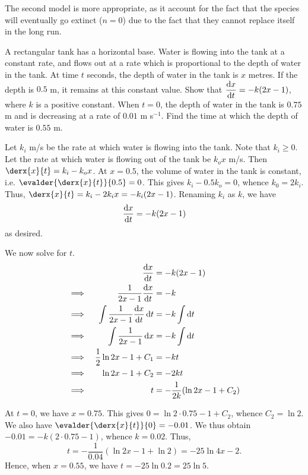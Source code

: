 \documentclass{echw}
\begin{document}
        The second model is more appropriate, as it account for the fact that the species will eventually go extinct ($n = 0$) due to the fact that they cannot replace itself in the long run.

    \problem{}
        A rectangular tank has a horizontal base. Water is flowing into the tank at a constant rate, and flows out at a rate which is proportional to the depth of water in the tank. At time $t$ seconds, the depth of water in the tank is $x$ metres. If the depth is $0.5$ m, it remains at this constant value. Show that $\dfrac{\mathrm{d} x}{\mathrm{d} t} = -k(2x-1)$, where $k$ is a positive constant. When $t = 0$, the depth of water in the tank is $0.75$ m and is decreasing at a rate of $0.01$ m s$^{-1}$. Find the time at which the depth of water is $0.55$ m.
        
    \solution
        Let $k_i$ m/s be the rate at which water is flowing into the tank. Note that $k_i \geq 0$. Let the rate at which water is flowing out of the tank be $k_o x$ m/s. Then $\derx{x}{t} = k_i - k_o x$. At $x = 0.5$, the volume of water in the tank is constant, i.e. $\evalder{\derx{x}{t}}{0.5} = 0$. This gives $k_i - 0.5 k_o = 0$, whence $k_0 = 2k_i$. Thus, $\derx{x}{t} = k_i - 2k_i x = -k_i (2x - 1)$. Renaming $k_i$ as $k$, we have \[\dfrac{\mathrm{d} x}{\mathrm{d} t} = -k(2x - 1)\] as desired.

        We now solve for $t$.
        \begin{alignat*}{2}
            &&\dfrac{\mathrm{d} x}{\mathrm{d} t} &= -k(2x - 1)\\
            \implies&& \dfrac{1}{2x-1} \dfrac{\mathrm{d} x}{\mathrm{d} t} &= -k\\
            \implies&& \int \dfrac{1}{2x-1} \dfrac{\mathrm{d} x}{\mathrm{d} t} \mathop{\mathrm{d}t} &= -k \int \mathop{\mathrm{d}t}\\
            \implies&& \int \dfrac{1}{2x-1} \mathop{\mathrm{d}x} &= -k \int \mathop{\mathrm{d}t}\\
            \implies&& \dfrac12 \ln{2x-1} + C_1 &= -kt \\
            \implies&& \ln{2x-1} + C_2 &= -2kt\\
            \implies&& t &= -\dfrac{1}{2k}(\ln{2x-1} + C_2)
        \end{alignat*}

        At $t = 0$, we have $x = 0.75$. This gives $0 = \ln{2 \cdot 0.75 - 1} + C_2$, whence $C_2 = \ln2$. We also have $\evalder{\derx{x}{t}}{0} = -0.01$. We thus obtain $-0.01 = -k(2 \cdot 0.75 -1)$, whence $k = 0.02$. Thus, \[t = -\dfrac{1}{0.04}(\ln{2x-1} + \ln2) = -25 \ln{4x-2}.\] Hence, when $x = 0.55$, we have $t = -25\ln 0.2 = 25\ln5$.
\end{document}
